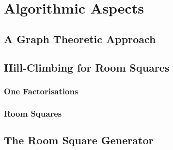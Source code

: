 \documentclass[a4paper, draft]{book}
\begin{document}
\part{Algorithmic Aspects}

\chapter{A Graph Theoretic Approach}
  \label{ch:graph-theoretic}
  

\chapter{Hill-Climbing for Room Squares}
  \label{ch:hill-climbing}
  
  \section{One Factorisations}
  
  \section{Room Squares}
  

\appendix
\chapter{The Room Square Generator}
  \label{ch:room-square-generator}
  

\backmatter
\printbibliography[title=References]

\printindex
\end{document}
